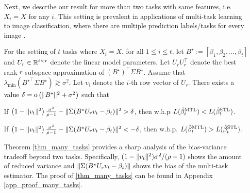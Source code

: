 Next, we describe our result for more than two tasks with same features, i.e. $X_i = X$ for any $i$.
This setting is prevalent in applications of multi-task learning to image classification, where there are multiple prediction labels/tasks for every image \cite{chexnet17,EA20}.
\begin{theorem}\label{thm_many_tasks}
	For the setting of $t$ tasks where $X_i = X$, for all $1\le i\le t$,
	let $B^\star := [{\beta}_1,{\beta}_2,\dots,{\beta}_{t}]$ and $U_r\in\mathbb{R}^{t\times r}$ denote the linear model parameters.
	Let $U_r U_r^{\top}$ denote the best rank-$r$ subspace approximation of $(B^{\star})^\top\Sigma B^{\star}$.
	Assume that $\lambda_{\min}({B^{\star}}^\top\Sigma B^{\star})\gtrsim \sigma^2$.
	Let $v_i$ denote the $i$-th row vector of $U_r$.
	There exists a value $\delta = \operatorname{o} \left( \|B^\star\|^2 + \sigma^2\right)$ such that
	\squishlist
		\item  If	$\left(1 - \|v_t\|^2 \right)\frac{\sigma^2}{\rho - 1} - \|\Sigma (B^{\star} U_r v_t - \beta_t)\|^2 > \delta$, then w.h.p $L(\hat{\beta}_t^{\text{MTL}}) < L(\hat{\beta}_t^{\text{STL}})$.
		\item If $\left(1 - \|v_t\|^2\right)\frac{\sigma^2}{\rho - 1} - \|\Sigma(B^{\star} U_r v_t - \beta_t)\|^2 < -\delta$, then w.h.p. $L(\hat{\beta}_t^{\text{MTL}}) > L(\hat{\beta}_t^{\text{STL}})$.
	\squishend
\end{theorem}
Theorem \ref{thm_many_tasks} provides a sharp analysis of the bias-variance tradeoff beyond two tasks.
Specifically, $(1 - \|v_t\|^2)\sigma^2/(\rho - 1)$ shows the amount of reduced variance and $\|\Sigma (B^{\star} U_r v_t - \beta_t)\|$ shows the bias of the multi-task estimator.
The proof of \ref{thm_many_tasks} can be found in Appendix \ref{app_proof_many_tasks}.

